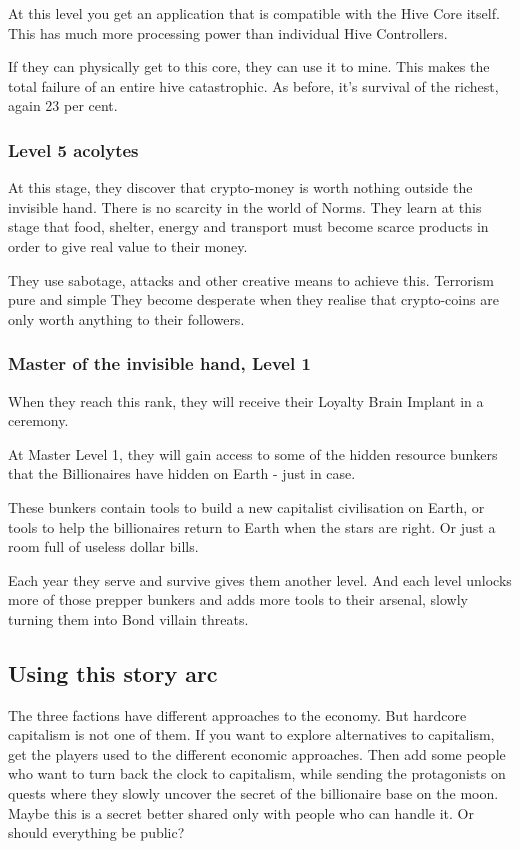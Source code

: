 At this level you get an application that is compatible with the Hive Core itself. This has much more processing power than individual Hive Controllers.

If they can physically get to this core, they can use it to mine. This makes the total failure of an entire hive catastrophic.
As before, it's survival of the richest, again 23 per cent.

\subsubsection{Level 5 acolytes}

At this stage, they discover that crypto-money is worth nothing outside the invisible hand. There is no scarcity in the world of Norms. They learn at this stage that food, shelter, energy and transport must become scarce products in order to give real value to their money.

They use sabotage, attacks and other creative means to achieve this. Terrorism pure and simple
They become desperate when they realise that crypto-coins are only worth anything to their followers.

\subsubsection{Master of the invisible hand, Level 1}

When they reach this rank, they will receive their Loyalty Brain Implant in a ceremony.

At Master Level 1, they will gain access to some of the hidden resource bunkers that the Billionaires have hidden on Earth - just in case.

These bunkers contain tools to build a new capitalist civilisation on Earth, or tools to help the billionaires return to Earth when the stars are right. Or just a room full of useless dollar bills.

Each year they serve and survive gives them another level. And each level unlocks more of those prepper bunkers and adds more tools to their arsenal, slowly turning them into Bond villain threats.


\subsection{Using this story arc}

The three factions have different approaches to the economy. But hardcore capitalism is not one of them. If you want to explore alternatives to capitalism, get the players used to the different economic approaches. Then add some people who want to turn back the clock to capitalism, while sending the protagonists on quests where they slowly uncover the secret of the billionaire base on the moon.
Maybe this is a secret better shared only with people who can handle it. Or should everything be public?

